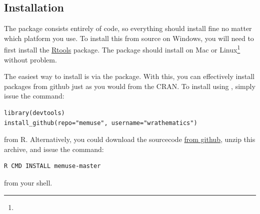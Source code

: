 \subsection{Installation}

The package consists entirely of  code, so everything should install fine no matter which platform you use.  To install this from source on Windows, you will need to first install the \href{http://cran.r-project.org/bin/windows/Rtools/Rtools216.exe}{Rtools} package.  The package should install on Mac or Linux\footnote{\interject} without problem.

The easiest way to install  is via the \href{http://cran.r-project.org/web/packages/devtools/index.html}{} package.  With this, you can effectively install packages from github just as you would from the CRAN.  To install  using , simply issue the command:
\begin{lstlisting}[language=rr]
library(devtools)
install_github(repo="memuse", username="wrathematics")
\end{lstlisting}
from R.  Alternatively, you could download the sourcecode \href{https://github.com/wrathematics/memuse/archive/master.zip}{from github}, unzip this archive, and issue the command:
\begin{lstlisting}[language=sh]
R CMD INSTALL memuse-master
\end{lstlisting}
from your shell.

